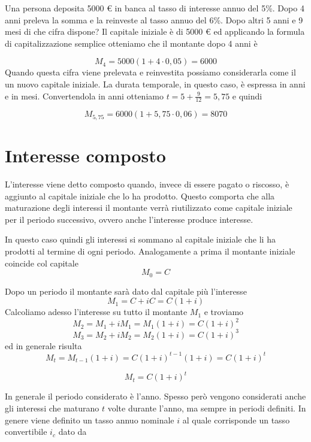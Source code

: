\begin{exrig}
\begin{esempio}
Una persona deposita 5000 € in banca al tasso di interesse annuo del 5\%. Dopo 
4 anni preleva la somma e la reinveste al tasso annuo del 6\%. Dopo altri 5 
anni 
e 9 mesi di che cifra dispone?
Il capitale iniziale è di 5000 € ed applicando la formula di capitalizzazione 
semplice otteniamo che il montante dopo 4 anni è

$$M_4 = 5000(1+4\cdot0,05) = 6000$$
Quando questa cifra viene prelevata e reinvestita possiamo considerarla come il 
un nuovo capitale iniziale. La durata temporale, in questo caso, è espressa in 
anni e in mesi. Convertendola in anni otteniamo $t = 5 +\frac{9}{12} = 5,75$ e 
quindi

$$M_{5,75} = 6000(1+5,75\cdot0,06) = 8070$$
\end{esempio}
\end{exrig}

\section{Interesse composto}

L'interesse viene detto composto quando, invece di essere pagato o riscosso, è 
aggiunto al capitale iniziale che lo ha prodotto. Questo comporta che alla 
maturazione degli interessi il montante verrà riutilizzato come capitale 
iniziale per il periodo successivo, ovvero anche l'interesse produce interesse.

In questo caso quindi gli interessi si sommano al capitale iniziale che li ha 
prodotti al termine di ogni periodo.
Analogamente a prima il montante iniziale coincide col capitale
$$ M_{0}=C $$

Dopo un periodo il montante sarà dato dal capitale più l'interesse
$$M_{1}=C+iC=C(1+i)$$
Calcoliamo adesso l'interesse su tutto il montante $M_1$ e troviamo
$$M_{2}=M_1+iM_1=M_1(1+i)=C(1+i)^2$$
$$M_{3}=M_2+iM_2=M_2(1+i)=C(1+i)^3$$
ed in generale risulta
$$M_{t}=M_{t-1}(1+i) = C(1+i)^{t-1}(1+i)=C(1+i)^{t}$$

\begin{definizione}
$$ M_{t}=C(1+i)^t $$
\end{definizione}

In generale il periodo considerato è l'anno. Spesso però vengono considerati 
anche gli interessi che maturano $t$ volte durante l'anno, ma sempre in periodi 
definiti. In genere viene definito un tasso annuo nominale $i$ al quale 
corrisponde un tasso convertibile $i_c$ dato da

